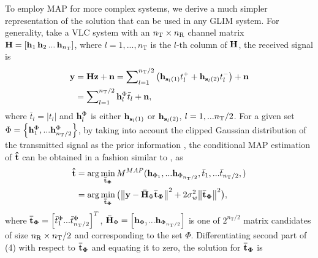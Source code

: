 \documentclass[12pt,letterpaper]{IEEEtran}
\begin{document}
To employ MAP for more complex systems, we derive a much simpler representation of the solution that can be used in any GLIM system. For generality, take a VLC system with an $n_{\text T} \times n_{\text R}$ channel matrix ${\bf{H}} = \left[ {{{\bf{h}}_1}\,{{\bf{h}}_2}\,...\,{{\bf{h}}_{{n_{\text{T}}}}}} \right]$, where $l = 1,...,{n_{\text{T}}}$ is the $l{\text{-th}}$ column of ${\bf{H}}$, the received signal is 
\begin{equation}
\begin{aligned}
{\bf{y}} &= {\bf{Hz}} + {\bf{n}} = \sum\nolimits_{l = 1}^{{n_{\text{T}}}/2} \left( {{{\bf{h}}_{{{\bf{s}}_{l}}(1)}}}t_l^ +  + {{{\bf{h}}_{{{\bf{s}}_{l}}(2)}}}t_l^ -  \right)  + {\bf{n}}\\
&= \sum\nolimits_{l = 1}^{{n_{\text{T}}}/2} {{\bf{h}}_l^\Phi } {\bar t_l} + {\bf{n}},
\end{aligned}
\end{equation}
where ${\bar t_{l}} = \left| {{t_{l}}} \right|$ and ${{\bf{h}}_l^\Phi }$ is either ${{{\bf{h}}_{{{\bf{s}}_{l}}(1)}}}$ or ${{{\bf{h}}_{{{\bf{s}}_{l}}(2)}}}$, $l = 1,...{n_{\text T}}/2$. For a given set $\Phi =\left\{ {{{\bf{h}}_{1}^\Phi},...{\bf{h}}_{n_{\text T}/2}^\Phi} \right\}$, by taking into account the clipped Gaussian distribution of the transmitted signal as the prior information \cite{yesilkaya_optical_2017}, the conditional MAP estimation of ${\bf{\hat t}}$ can be obtained in a fashion similar to \cite{yesilkaya_optical_2017}, as
\begin{equation}
\begin{aligned}
{{\bf{\hat t}}} &= \arg \mathop {\min }\limits_{{\bf{\bar t}_\Phi}} {M^{MAP}}({{\bf{h}}_{{\Phi _1}}},...{{\bf{h}}_{{\Phi _{{n_{\text{T}}}/2}}}},{\bar t_1},...{\bar t_{{n_{\text{T}}}/2}},)\\
&= \arg \mathop {\min }\limits_{{{{\bf{\bar t}}}_{\bf{\Phi }}}} \big({\left\| {{\bf{y}} - {{{\bf{\bar H}}}_\Phi }{{{\bf{\bar t}}}_{\bf{\Phi }}}} \right\|^2} + 2\sigma _w^2{\left\| {{{{\bf{\bar t}}}_{\bf{\Phi }}}} \right\|^2}\big),
\end{aligned}\\
\end{equation}
where ${{\bf{\bar t}_\Phi}} = {\left[ {\bar t_1^\Phi ...\bar t_{{n_{\text{T}}}/2}^\Phi } \right]^T}$, ${{\bf{\bar H}}_\Phi } = {\left[ {{{\bf{h}}_{{\Phi _1}}}...{{\bf{h}}_{{\Phi _{{n_{\text{T}}}/2}}}}} \right]}$ is one of ${2^{{n_{\text{T}}}/2}}$ matrix candidates of size ${n_{\text R}} \times {n_{\text T}/2}$ and corresponding to the set $\Phi$.
Differentiating second part of (4) with respect to ${{\bf{\bar t}_\Phi}}$ and equating it to zero, the solution for ${{\bf{\bar t}_\Phi}}$ is
\end{document}

